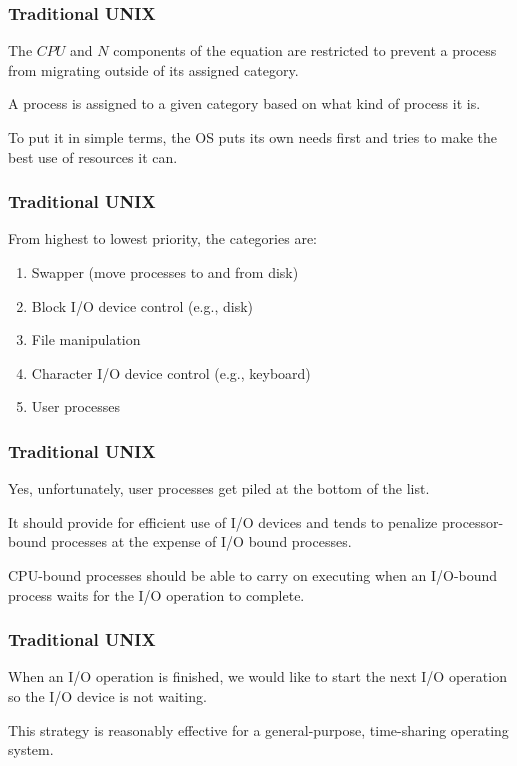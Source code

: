 \begin{frame}
\frametitle{Traditional UNIX}

The $CPU$ and $N$ components of the equation are restricted to prevent a process from migrating outside of its assigned category. 

A process is assigned to a given category based on what kind of process it is. 

To put it in simple terms, the OS puts its own needs first and tries to make the best use of resources it can.


\end{frame}

\begin{frame}
\frametitle{Traditional UNIX}

From highest to lowest priority, the categories are:

\begin{enumerate}
	\item Swapper (move processes to and from disk)
	\item Block I/O device control (e.g., disk)
	\item File manipulation
	\item Character I/O device control (e.g., keyboard)
	\item User processes
\end{enumerate}



\end{frame}

\begin{frame}
\frametitle{Traditional UNIX}

Yes, unfortunately, user processes get piled at the bottom of the list. 

It should provide for efficient use of I/O devices and tends to penalize processor-bound processes at the expense of I/O bound processes. 

CPU-bound processes should be able to carry on executing when an I/O-bound process waits for the I/O operation to complete. 
\end{frame}

\begin{frame}
\frametitle{Traditional UNIX}

When an I/O operation is finished, we would like to start the next I/O operation so the I/O device is not waiting.

This strategy is reasonably effective for a general-purpose, time-sharing operating system.

\end{frame}


